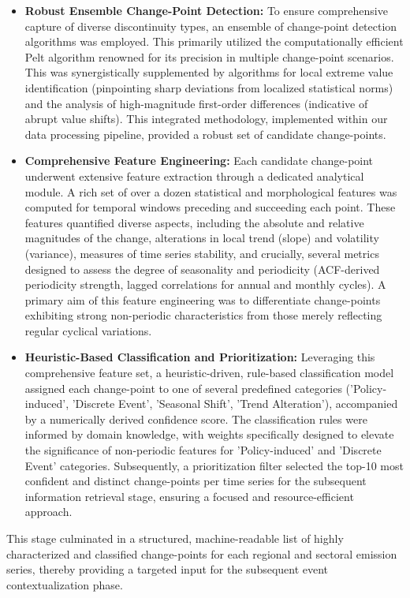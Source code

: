 \begin{itemize}
\item \textbf{Robust Ensemble Change-Point Detection:} To ensure comprehensive capture of diverse discontinuity types, an ensemble of change-point detection algorithms was employed. This primarily utilized the computationally efficient Pelt algorithm renowned for its precision in multiple change-point scenarios. This was synergistically supplemented by algorithms for local extreme value identification (pinpointing sharp deviations from localized statistical norms) and the analysis of high-magnitude first-order differences (indicative of abrupt value shifts). This integrated methodology, implemented within our data processing pipeline, provided a robust set of candidate change-points.
\item \textbf{Comprehensive Feature Engineering:} Each candidate change-point underwent extensive feature extraction through a dedicated analytical module. A rich set of over a dozen statistical and morphological features was computed for temporal windows preceding and succeeding each point. These features quantified diverse aspects, including the absolute and relative magnitudes of the change, alterations in local trend (slope) and volatility (variance), measures of time series stability, and crucially, several metrics designed to assess the degree of seasonality and periodicity (ACF-derived periodicity strength, lagged correlations for annual and monthly cycles). A primary aim of this feature engineering was to differentiate change-points exhibiting strong non-periodic characteristics from those merely reflecting regular cyclical variations.
\item \textbf{Heuristic-Based Classification and Prioritization:} Leveraging this comprehensive feature set, a heuristic-driven, rule-based classification model assigned each change-point to one of several predefined categories ('Policy-induced', 'Discrete Event', 'Seasonal Shift', 'Trend Alteration'), accompanied by a numerically derived confidence score. The classification rules were informed by domain knowledge, with weights specifically designed to elevate the significance of non-periodic features for 'Policy-induced' and 'Discrete Event' categories. Subsequently, a prioritization filter selected the top-10 most confident and distinct change-points per time series for the subsequent information retrieval stage, ensuring a focused and resource-efficient approach.
\end{itemize}
This stage culminated in a structured, machine-readable list of highly characterized and classified change-points for each regional and sectoral emission series, thereby providing a targeted input for the subsequent event contextualization phase.


